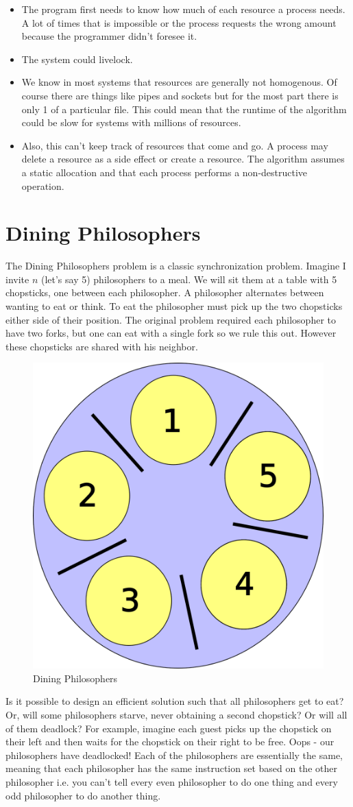 \begin{itemize}
\item The program first needs to know how much of each resource a process needs. A lot of times that is impossible or the process requests the wrong amount because the programmer didn't foresee it.
\item The system could livelock.
\item We know in most systems that resources are generally not homogenous. Of course there are things like pipes and sockets but for the most part there is only 1 of a particular file. This could mean that the runtime of the algorithm could be slow for systems with millions of resources.
\item Also, this can't keep track of resources that come and go. A process may delete a resource as a side effect or create a resource. The algorithm assumes a static allocation and that each process performs a non-destructive operation.
\end{itemize}

\section{Dining Philosophers}

The Dining Philosophers problem is a classic synchronization problem.
Imagine I invite $n$ (let's say 5) philosophers to a meal.
We will sit them at a table with 5 chopsticks, one between each philosopher.
A philosopher alternates between wanting to eat or think.
To eat the philosopher must pick up the two chopsticks either side of their position.
The original problem required each philosopher to have two forks, but one can eat with a single fork so we rule this out.
However these chopsticks are shared with his neighbor.

\begin{figure}
  \begin{center}
\includegraphics[width=.2\textwidth]{deadlock/images/5DiningPhilosophers.png}
\end{center}
  \caption{Dining Philosophers}
\end{figure}

Is it possible to design an efficient solution such that all philosophers get to eat? Or, will some philosophers starve, never obtaining a second chopstick? Or will all of them deadlock? For example, imagine each guest picks up the chopstick on their left and then waits for the chopstick on their right to be free.
Oops - our philosophers have deadlocked! Each of the philosophers are essentially the same, meaning that each philosopher has the same instruction set based on the other philosopher i.e. you can't tell every even philosopher to do one thing and every odd philosopher to do another thing.


